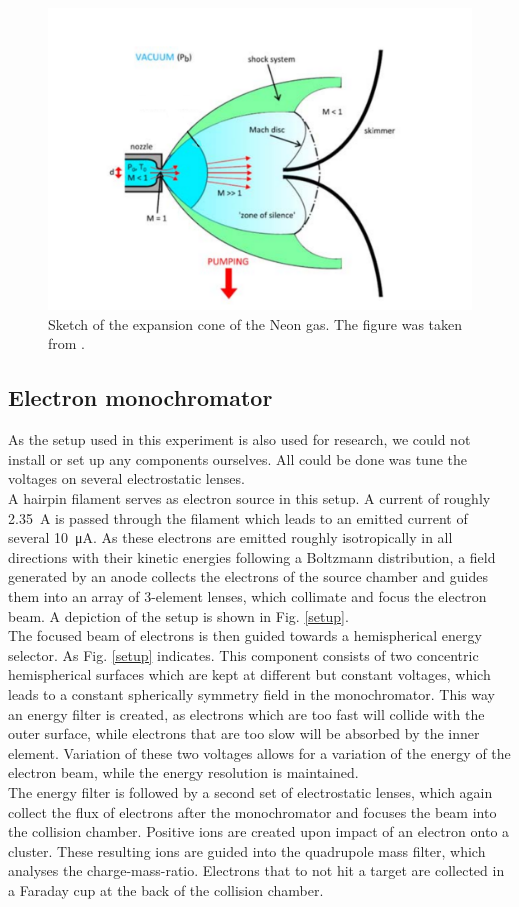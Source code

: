 \documentclass[a4paper,10pt]{article}
\begin{document}
\begin{figure}[htp!]
	\centering
	\includegraphics[width = 0.6 \textwidth]{expansion.png}
	\caption{Sketch of the expansion cone of the Neon gas. The figure was taken from \cite{script}. }
	\label{fig_expansion}
\end{figure}

\subsection{Electron monochromator}

As the setup used in this experiment is also used for research, we could not install or set up any components ourselves. All could be done was tune the voltages on several electrostatic lenses.
\\
A hairpin filament serves as electron source in this setup. A current of roughly \SI{2.35}{\ampere} is passed through the filament which leads to an emitted current of several \SI{10}{\micro \ampere}. As these electrons are emitted roughly isotropically in all directions with their kinetic energies following a Boltzmann distribution, a field generated by an anode collects the electrons of the source chamber and guides them into an array of 3-element lenses, which collimate and focus the electron beam. A depiction of the setup is shown in Fig. \ref{setup}.
\\
The focused beam of electrons is then guided towards a hemispherical energy selector. As Fig. \ref{setup} indicates. This component consists of two concentric hemispherical surfaces which are kept at different but constant voltages, which leads to a constant spherically symmetry field in the monochromator. This way an energy filter is created, as electrons which are too fast will collide with the outer surface, while electrons that are too slow will be absorbed by the inner element. Variation of these two voltages allows for a variation of the energy of the electron beam, while the energy resolution is maintained.
\\
The energy filter is followed by a second set of electrostatic lenses, which again collect the flux of electrons after the monochromator and focuses the beam into the collision chamber. Positive ions are created upon impact of an electron onto a cluster. These resulting ions are guided into the quadrupole mass filter, which analyses the charge-mass-ratio. Electrons that to not hit a target are collected in a Faraday cup at the back of the collision chamber.
\end{document}
